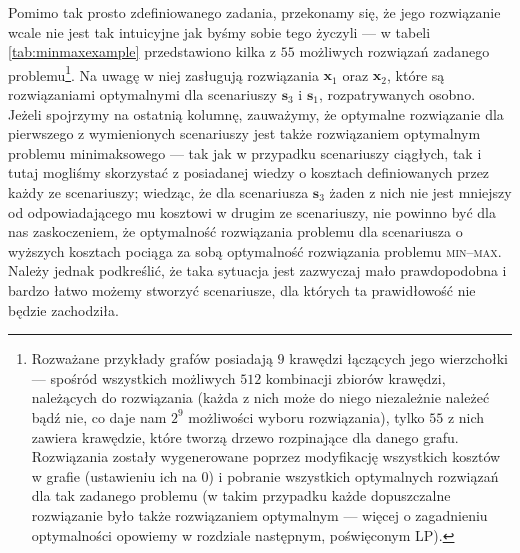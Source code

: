 Pomimo tak prosto zdefiniowanego zadania, przekonamy się, że jego rozwiązanie wcale nie jest tak intuicyjne jak byśmy sobie tego życzyli --- w tabeli \ref{tab:minmaxexample} przedstawiono kilka z $55$ możliwych rozwiązań zadanego problemu\footnote{Rozważane przykłady grafów posiadają $9$ krawędzi łączących jego wierzchołki --- spośród wszystkich możliwych $512$ kombinacji zbiorów krawędzi, należących do rozwiązania (każda z nich może do niego niezależnie należeć bądź nie, co daje nam $2^{9}$ możliwości wyboru rozwiązania), tylko $55$ z nich zawiera krawędzie, które tworzą drzewo rozpinające dla danego grafu. Rozwiązania zostały wygenerowane poprzez modyfikację wszystkich kosztów w grafie (ustawieniu ich na $0$) i pobranie wszystkich optymalnych rozwiązań dla tak zadanego problemu (w takim przypadku każde dopuszczalne rozwiązanie było także rozwiązaniem optymalnym --- więcej o zagadnieniu optymalności opowiemy w rozdziale następnym, poświęconym LP).}. Na uwagę w niej zasługują rozwiązania $\textbf{x}_{1}$ oraz $\textbf{x}_{2}$, które są rozwiązaniami optymalnymi dla scenariuszy $\textbf{s}_{3}$ i $\textbf{s}_{1}$, rozpatrywanych osobno. Jeżeli spojrzymy na ostatnią kolumnę, zauważymy, że optymalne rozwiązanie dla pierwszego z wymienionych scenariuszy jest także rozwiązaniem optymalnym problemu minimaksowego --- tak jak w przypadku scenariuszy ciągłych, tak i tutaj mogliśmy skorzystać z posiadanej wiedzy o kosztach definiowanych przez każdy ze scenariuszy; wiedząc, że dla scenariusza $\textbf{s}_{3}$ żaden z nich nie jest mniejszy od odpowiadającego mu kosztowi w drugim ze scenariuszy, nie powinno być dla nas zaskoczeniem, że optymalność rozwiązania problemu dla scenariusza o wyższych kosztach pociąga za sobą optymalność rozwiązania problemu \textsc{min--max}. Należy jednak podkreślić, że taka sytuacja jest zazwyczaj mało prawdopodobna i bardzo łatwo możemy stworzyć scenariusze, dla których ta prawidłowość nie będzie zachodziła.

